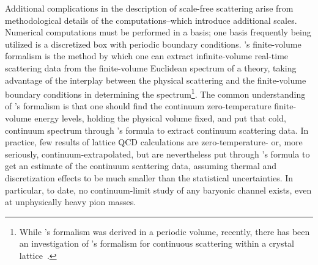 Additional complications in the description of scale-free scattering arise from methodological details of the computations--which introduce additional scales.
Numerical computations must be performed in a basis; one basis frequently being utilized is a discretized box with periodic boundary conditions.
\Luscher's finite-volume formalism\cite{Hamber198399,luscher:1986I,luscher:1986II,wiese1989,Luscher1991,Luscher1991237} is the method by which one can extract infinite-volume real-time scattering data from the finite-volume Euclidean spectrum of a theory, taking advantage of the interplay between the physical scattering and the finite-volume boundary conditions in determining the spectrum\footnote{While \Luscher's formalism was derived in a periodic volume, recently, there has been an investigation of \Luscher's formalism for continuous scattering within a crystal lattice~\cite{Valiente:2015oya}.}.
The common understanding of \Luscher's formalism is that one should find the continuum zero-temperature finite-volume energy levels, holding the physical volume fixed, and put that cold, continuum spectrum through \Luscher's formula to extract continuum scattering data.
In practice, few results of lattice QCD calculations are zero-temperature- or, more seriously, continuum-extrapolated, but are nevertheless put through \Luscher's formula to get an estimate of the continuum scattering data, assuming thermal and discretization effects to be much smaller than the statistical uncertainties.
In particular, to date, no continuum-limit study of any baryonic channel exists, even at unphysically heavy pion masses.

